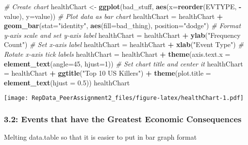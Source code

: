 \documentclass[
]{article}
\newenvironment{Shaded}{\begin{snugshade}}{\end{snugshade}}
\newcommand{\CommentTok}[1]{\textcolor[rgb]{0.56,0.35,0.01}{\textit{#1}}}
\newcommand{\DataTypeTok}[1]{\textcolor[rgb]{0.13,0.29,0.53}{#1}}
\newcommand{\DecValTok}[1]{\textcolor[rgb]{0.00,0.00,0.81}{#1}}
\newcommand{\FloatTok}[1]{\textcolor[rgb]{0.00,0.00,0.81}{#1}}
\newcommand{\KeywordTok}[1]{\textcolor[rgb]{0.13,0.29,0.53}{\textbf{#1}}}
\newcommand{\NormalTok}[1]{#1}
\newcommand{\OperatorTok}[1]{\textcolor[rgb]{0.81,0.36,0.00}{\textbf{#1}}}
\newcommand{\StringTok}[1]{\textcolor[rgb]{0.31,0.60,0.02}{#1}}
\begin{document}
\begin{Shaded}
\begin{Highlighting}[]
\CommentTok{# Create chart}
\NormalTok{healthChart <-}\StringTok{ }\KeywordTok{ggplot}\NormalTok{(bad_stuff, }\KeywordTok{aes}\NormalTok{(}\DataTypeTok{x=}\KeywordTok{reorder}\NormalTok{(EVTYPE, }\OperatorTok{-}\NormalTok{value), }\DataTypeTok{y=}\NormalTok{value))}
\CommentTok{# Plot data as bar chart}
\NormalTok{healthChart =}\StringTok{ }\NormalTok{healthChart }\OperatorTok{+}\StringTok{ }\KeywordTok{geom_bar}\NormalTok{(}\DataTypeTok{stat=}\StringTok{"identity"}\NormalTok{, }\KeywordTok{aes}\NormalTok{(}\DataTypeTok{fill=}\NormalTok{bad_thing), }\DataTypeTok{position=}\StringTok{"dodge"}\NormalTok{)}
\CommentTok{# Format y-axis scale and set y-axis label}
\NormalTok{healthChart =}\StringTok{ }\NormalTok{healthChart }\OperatorTok{+}\StringTok{ }\KeywordTok{ylab}\NormalTok{(}\StringTok{"Frequency Count"}\NormalTok{) }
\CommentTok{# Set x-axis label}
\NormalTok{healthChart =}\StringTok{ }\NormalTok{healthChart }\OperatorTok{+}\StringTok{ }\KeywordTok{xlab}\NormalTok{(}\StringTok{"Event Type"}\NormalTok{) }
\CommentTok{# Rotate x-axis tick labels }
\NormalTok{healthChart =}\StringTok{ }\NormalTok{healthChart }\OperatorTok{+}\StringTok{ }\KeywordTok{theme}\NormalTok{(}\DataTypeTok{axis.text.x =} \KeywordTok{element_text}\NormalTok{(}\DataTypeTok{angle=}\DecValTok{45}\NormalTok{, }\DataTypeTok{hjust=}\DecValTok{1}\NormalTok{))}
\CommentTok{# Set chart title and center it}
\NormalTok{healthChart =}\StringTok{ }\NormalTok{healthChart }\OperatorTok{+}\StringTok{ }\KeywordTok{ggtitle}\NormalTok{(}\StringTok{"Top 10 US Killers"}\NormalTok{) }\OperatorTok{+}\StringTok{ }\KeywordTok{theme}\NormalTok{(}\DataTypeTok{plot.title =} \KeywordTok{element_text}\NormalTok{(}\DataTypeTok{hjust =} \FloatTok{0.5}\NormalTok{))}
\NormalTok{healthChart}
\end{Highlighting}
\end{Shaded}

\texttt{[image: RepData\_PeerAssignment2\_files/figure-latex/healthChart-1.pdf]}

\hypertarget{events-that-have-the-greatest-economic-consequences}{%
\subsubsection{3.2: Events that have the Greatest Economic
Consequences}\label{events-that-have-the-greatest-economic-consequences}}

Melting data.table so that it is easier to put in bar graph format
\end{document}
